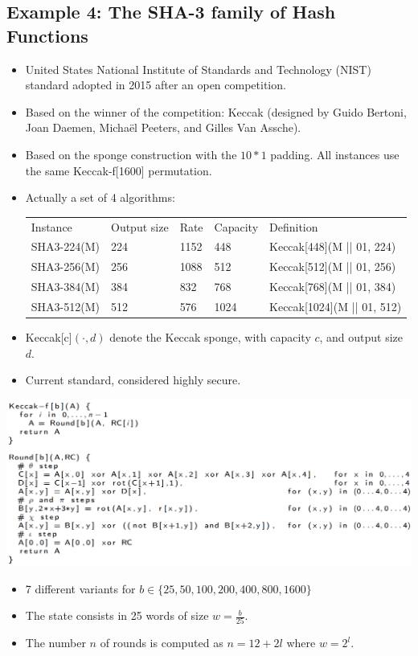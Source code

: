 	\subsection{Example 4: The SHA-3 family of Hash Functions}
		\begin{itemize}
			\item United States National Institute of Standards and Technology (NIST) standard adopted in 2015 after an open competition.
			\item Based on the winner of the competition: Keccak (designed by Guido Bertoni, Joan Daemen, Michaël Peeters, and Gilles Van Assche).
			\item Based on the sponge construction with the $10*1$ padding. 
			All instances use the same Keccak-f[1600] permutation.
			\item Actually a set of 4 algorithms:
			\begin{center}
				\begin{tabular}[h]{lllll}
					Instance & Output size & Rate & Capacity & Definition\\
					SHA3-224(M) & 224 & 1152 & 448 & Keccak[448](M || 01, 224)\\
					SHA3-256(M) & 256 & 1088 & 512 & Keccak[512](M || 01, 256)\\
					SHA3-384(M) & 384 & 832 & 768 & Keccak[768](M || 01, 384)\\
					SHA3-512(M) & 512 & 576 & 1024 & Keccak[1024](M || 01, 512)
				\end{tabular}
			\end{center}
			\item Keccak[c]$(\cdot, d)$ denote the Keccak sponge, with capacity $c$, and output size $d$.
			\item Current standard, considered highly secure.
		\end{itemize}
	   	\begin{center}
			\includegraphics[width=140mm]{Graphics/Hash Functions/hf9.5.png}
		\end{center}
		\begin{itemize}
			\item 7 different variants for $b \in \{25, 50, 100, 200, 400, 800, 1600\}$
			\item The state consists in 25 words of size $w = \frac{b}{25}$.
			\item The number $n$ of rounds is computed as $n = 12 + 2l$ where $w = 2^l$.
		\end{itemize}

